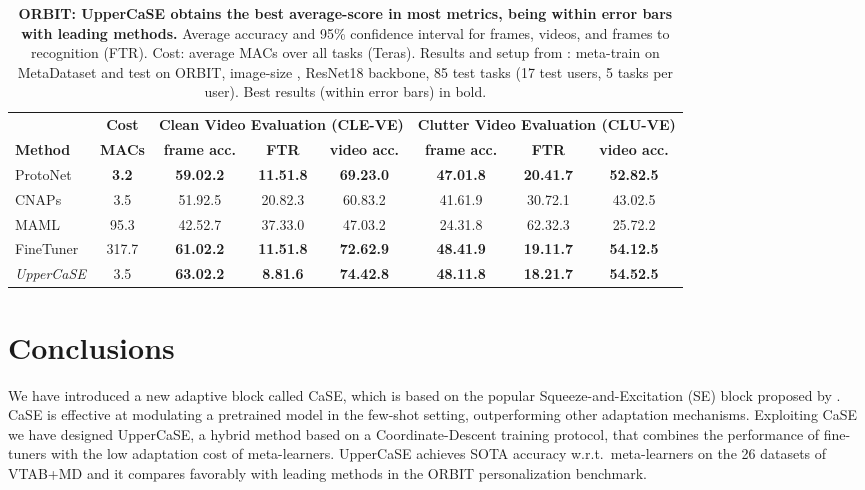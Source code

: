 \documentclass{article}
\begin{document}
\begin{table}[t]
\caption{\textbf{ORBIT: UpperCaSE obtains the best average-score in most metrics, being within error bars with leading methods.}  Average accuracy and 95\% confidence interval for frames, videos, and frames to recognition (FTR). Cost: average MACs over all tasks (Teras). Results and setup from \cite{massiceti2021orbit}: meta-train on MetaDataset and test on ORBIT, image-size , ResNet18 backbone, 85 test tasks (17 test users, 5 tasks per user). Best results (within error bars) in bold.}
\vskip 0.1in
\begin{adjustbox}{width=1.0\textwidth,center}
\begin{tabular}{lccccccc}
\toprule
 & \multicolumn{1}{c}{\textbf{Cost}} & \multicolumn{3}{c}{\textbf{Clean Video Evaluation (CLE-VE)}} & \multicolumn{3}{c}{\textbf{Clutter Video Evaluation (CLU-VE)}} \\
 \cmidrule(lr){2-2} \cmidrule(lr){3-5} \cmidrule(lr){6-8}
 \textbf{Method} & \textbf{MACs} & \textbf{frame acc.} & \textbf{FTR} & \textbf{video acc.} & \textbf{frame acc.} & \textbf{FTR}  & \textbf{video acc.}\\
\midrule
ProtoNet & \textbf{3.2} & \textbf{59.02.2} & \textbf{11.51.8} & \textbf{69.23.0} & \textbf{47.01.8} & \textbf{20.41.7} & \textbf{52.82.5}\\
CNAPs & 3.5 & 51.92.5 & 20.82.3 & 60.83.2 & 41.61.9 & 30.72.1 & 43.02.5\\
MAML & 95.3  & 42.52.7 & 37.33.0 & 47.03.2 & 24.31.8 & 62.32.3 & 25.72.2 \\
FineTuner & 317.7 & \textbf{61.02.2} & \textbf{11.51.8} & \textbf{72.62.9} & \textbf{48.41.9} & \textbf{19.11.7} & \textbf{54.12.5} \\
\midrule
\emph{UpperCaSE} & 3.5 & \textbf{63.02.2} & \textbf{8.81.6} & \textbf{74.42.8} & \textbf{48.11.8} & \textbf{18.21.7} & \textbf{54.52.5}\\
\bottomrule
\end{tabular}
\end{adjustbox}
\label{tab:orbit_results}
\end{table}


\section{Conclusions} \label{sec:conclusions}

We have introduced a new adaptive block called CaSE, which is based on the popular Squeeze-and-Excitation (SE) block proposed by \cite{hu2018squeeze}. CaSE is effective at modulating a pretrained model in the few-shot setting, outperforming other adaptation mechanisms. Exploiting CaSE we have designed UpperCaSE, a hybrid method based on a Coordinate-Descent training protocol, that combines the performance of fine-tuners with the low adaptation cost of meta-learners. UpperCaSE achieves SOTA accuracy w.r.t.~meta-learners on the 26 datasets of VTAB+MD and it compares favorably with leading methods in the ORBIT personalization benchmark. 
\end{document}
